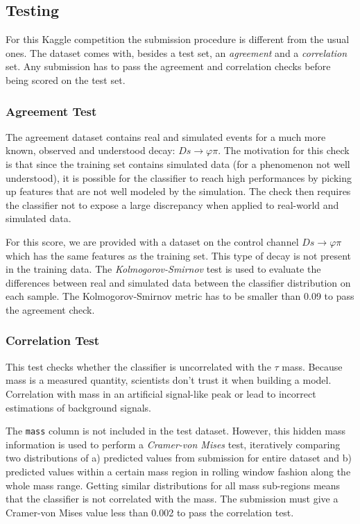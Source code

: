 \documentclass[11pt]{article}
\begin{document}
\subsection{Testing}
For this Kaggle competition the submission procedure is different from the usual
ones. The dataset comes with, besides a test set, an \textit{agreement} and a
\textit{correlation} set. Any submission has to pass the agreement and
correlation checks before being scored on the test set.

\subsubsection{Agreement Test}
\label{sec:agreement}
The agreement dataset contains real and simulated events for a much more known,
observed and understood decay: $Ds \rightarrow \varphi\pi$. The motivation for
this check is that since the training set contains simulated data (for a
phenomenon not well understood), it is possible for the classifier to reach high
performances by picking up features that are not well modeled by the simulation.
The check then requires the classifier not to expose a large discrepancy when
applied to real-world and simulated data.

For this score, we are provided with a dataset on the control channel $Ds
\rightarrow \varphi\pi$ which has the same features as the training set. This
type of decay is not present in the training data. The
\textit{Kolmogorov-Smirnov} test is used to evaluate the differences between
real and simulated data between the classifier distribution on each sample.
The Kolmogorov-Smirnov metric has to be smaller than 0.09 to pass the agreement
check.

\subsubsection{Correlation Test}
\label{sec:correlation}
This test checks whether the classifier is uncorrelated with the $\tau$ mass.
Because mass is a measured quantity, scientists don't trust it when building a
model. Correlation with mass in an artificial signal-like peak or lead to
incorrect estimations of background signals.

The \texttt{mass} column is not included in the test dataset. However, this hidden
mass information is used to perform a \textit{Cramer-von Mises} test,
iteratively comparing two distributions of a) predicted values from submission
for entire dataset and b) predicted values within a certain mass region in
rolling window fashion along the whole mass range. Getting similar distributions
for all mass sub-regions means that the classifier is not correlated with the
mass. The submission must give a Cramer-von Mises value less than 0.002 to pass
the correlation test.
\end{document}
